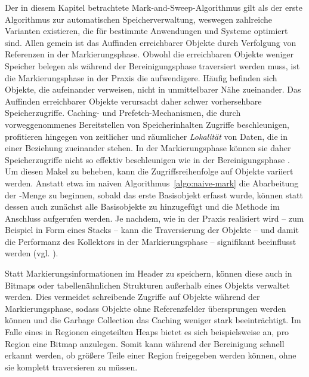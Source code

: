 Der in diesem Kapitel betrachtete Mark-and-Sweep-Algorithmus gilt als der erste Algorithmus zur automatischen Speicherverwaltung, weswegen zahlreiche Varianten existieren, die für bestimmte Anwendungen und Systeme optimiert sind.
Allen gemein ist das Auffinden erreichbarer Objekte durch Verfolgung von Referenzen in der Markierungsphase.
Obwohl die erreichbaren Objekte weniger Speicher belegen als während der Bereinigungsphase traversiert werden muss, ist die Markierungsphase in der Praxis die aufwendigere.
Häufig befinden sich Objekte, die aufeinander verweisen, nicht in unmittelbarer Nähe zueinander.
Das Auffinden erreichbarer Objekte verursacht daher schwer vorhersehbare Speicherzugriffe.
Caching- und Prefetch-Mechanismen, die durch vorweggenommenes Bereitstellen von Speicherinhalten Zugriffe beschleunigen, profitieren hingegen von zeitlicher und räumlicher \textit{Lokalität} von Daten, die in einer Beziehung zueinander stehen.
In der Markierungsphase können sie daher Speicherzugriffe nicht so effektiv beschleunigen wie in der Bereinigungsphase \cite[S. 21f]{handbook}.
Um diesen Makel zu beheben, kann die Zugriffsreihenfolge auf Objekte variiert werden.
Anstatt etwa im naiven Algorithmus~\ref{algo:naive-mark} die Abarbeitung der -Menge zu beginnen, sobald das erste Basisobjekt erfasst wurde, können statt dessen auch zunächst alle Basisobjekte zu  hinzugefügt und die Methode  im Anschluss aufgerufen werden.
Je nachdem, wie  in der Praxis realisiert wird -- zum Beispiel in Form eines Stacks -- kann die Traversierung der Objekte -- und damit die Performanz des Kollektors in der Markierungsphase -- signifikant beeinflusst werden (vgl. \cite[S. 19]{handbook}).

Statt Markierungsinformationen im Header zu speichern, können diese auch in Bitmaps oder tabellenähnlichen Strukturen außerhalb eines Objekts verwaltet werden.
Dies vermeidet schreibende Zugriffe auf Objekte während der Markierungsphase, sodass Objekte ohne Referenzfelder übersprungen werden können und die Garbage Collection das Caching weniger stark beeinträchtigt.
Im Falle eines in Regionen eingeteilten Heaps bietet es sich beispielsweise an, pro Region eine Bitmap anzulegen.
Somit kann während der Bereinigung schnell erkannt werden, ob größere Teile einer Region freigegeben werden können, ohne sie komplett traversieren zu müssen.


